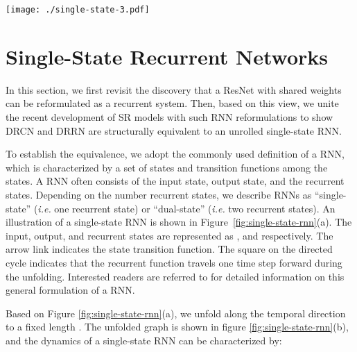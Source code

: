 \documentclass[10pt,twocolumn,letterpaper]{article}
\begin{document}
%
 
\begin{figure*}[t!]
\centering
\texttt{[image: ./single-state-3.pdf]}
\caption{(a) An example of a single-state RNN, which is characterized by an input state , output state  and a single recurrent state .  The arrow links indicate the state transition function.  The black square represents the state transition function delayed for one time step.  (b) Finite unfolding ( times) of a single-state RNN.  (c) - (e) The required recurrent function to make a single-state RNN equivalent to ResNet, DRCN, and DRRN, respectively.  Different colors of the ``Conv'' layers indicate different parameters. }
\label{fig:single-state-rnn}
\end{figure*}

\section{Single-State Recurrent Networks}
\label{sect:single-state}
In this section, we first revisit the discovery that a ResNet with shared weights can be reformulated as a recurrent system.   Then, based on this view, we unite the recent development of SR models with such RNN reformulations to show DRCN and DRRN are structurally equivalent to an unrolled single-state RNN. 

To establish the equivalence, we adopt the commonly used definition of a RNN, which is characterized by a set of states and transition functions among the states.  A RNN often consists of the input state, output state, and the recurrent states.  Depending on the number recurrent states, we describe RNNs as ``single-state'' (\emph{i.e.} one recurrent state) or ``dual-state'' (\emph{i.e.} two recurrent states).  An illustration of a single-state RNN is shown in Figure~\ref{fig:single-state-rnn}(a).  The input, output, and recurrent states are represented as ,  and  respectively.  The arrow link indicates the state transition function.  The square on the directed cycle indicates that the recurrent function travels one time step forward during the unfolding.  Interested readers are referred to \cite{zhang2016architectural} for detailed information on this general formulation of a RNN.  

Based on Figure \ref{fig:single-state-rnn}(a), we unfold along the temporal direction to a fixed length .  The unfolded graph is shown in figure \ref{fig:single-state-rnn}(b), and the dynamics of a single-state RNN can be characterized by:
\end{document}
